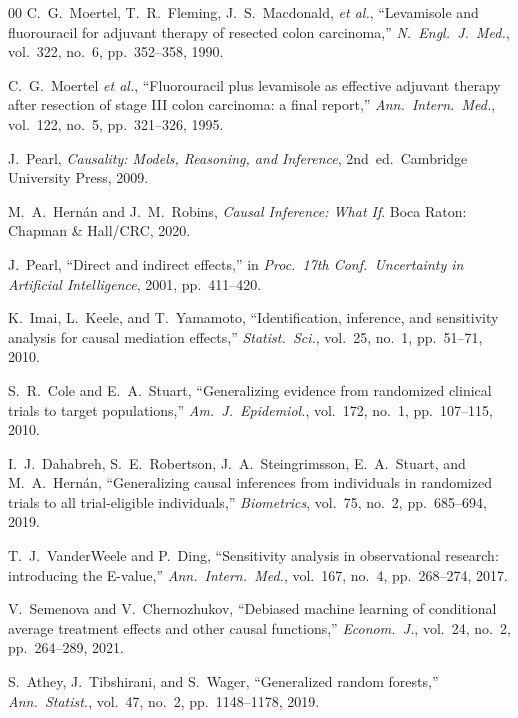 \documentclass[conference]{IEEEtran}
\begin{document}
\begin{thebibliography}{00}
 C.~G.\ Moertel, T.~R.\ Fleming, J.~S.\ Macdonald, \emph{et al.}, ``Levamisole and fluorouracil for adjuvant therapy of resected colon carcinoma,'' \emph{N.\ Engl.\ J.\ Med.}, vol.~322, no.~6, pp.~352--358, 1990.

 C.~G.\ Moertel \emph{et al.}, ``Fluorouracil plus levamisole as effective adjuvant therapy after resection of stage III colon carcinoma: a final report,'' \emph{Ann.\ Intern.\ Med.}, vol.~122, no.~5, pp.~321--326, 1995.

 J.~Pearl, \emph{Causality: Models, Reasoning, and Inference}, 2nd~ed.\ Cambridge University Press, 2009.

 M.~A.\ Hern\'{a}n and J.~M.\ Robins, \emph{Causal Inference: What If}. Boca Raton: Chapman \& Hall/CRC, 2020.

 J.~Pearl, ``Direct and indirect effects,'' in \emph{Proc.\ 17th Conf.\ Uncertainty in Artificial Intelligence}, 2001, pp.~411--420.

 K.~Imai, L.~Keele, and T.~Yamamoto, ``Identification, inference, and sensitivity analysis for causal mediation effects,'' \emph{Statist.\ Sci.}, vol.~25, no.~1, pp.~51--71, 2010.

 S.~R.\ Cole and E.~A.\ Stuart, ``Generalizing evidence from randomized clinical trials to target populations,'' \emph{Am.\ J.\ Epidemiol.}, vol.~172, no.~1, pp.~107--115, 2010.

 I.~J.\ Dahabreh, S.~E.\ Robertson, J.~A.\ Steingrimsson, E.~A.\ Stuart, and M.~A.\ Hern\'{a}n, ``Generalizing causal inferences from individuals in randomized trials to all trial-eligible individuals,'' \emph{Biometrics}, vol.~75, no.~2, pp.~685--694, 2019.

 T.~J.\ VanderWeele and P.~Ding, ``Sensitivity analysis in observational research: introducing the E-value,'' \emph{Ann.\ Intern.\ Med.}, vol.~167, no.~4, pp.~268--274, 2017.

 V.~Semenova and V.~Chernozhukov, ``Debiased machine learning of conditional average treatment effects and other causal functions,'' \emph{Econom.\ J.}, vol.~24, no.~2, pp.~264--289, 2021.

 S.~Athey, J.~Tibshirani, and S.~Wager, ``Generalized random forests,'' \emph{Ann.\ Statist.}, vol.~47, no.~2, pp.~1148--1178, 2019.

\end{thebibliography}
\end{document}
